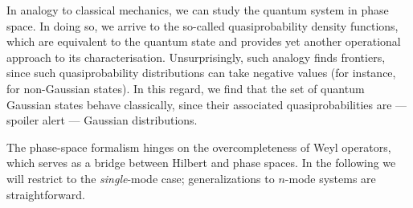 In analogy to classical mechanics, we can study the quantum system in phase space. In doing so, we arrive to the so-called quasiprobability density functions, which are equivalent to the quantum state and provides yet another operational approach to its characterisation. Unsurprisingly, such analogy finds frontiers, since such quasiprobability distributions can take negative values (for instance, for non-Gaussian states). In this regard, we find that the set of quantum Gaussian states behave classically, since their associated quasiprobabilities are --- spoiler alert --- Gaussian distributions.

The phase-space formalism hinges on the overcompleteness of Weyl operators, which serves as a bridge between Hilbert and phase spaces. In the following we will restrict to the \textit{single}-mode case; generalizations to $n$-mode systems are straightforward.

